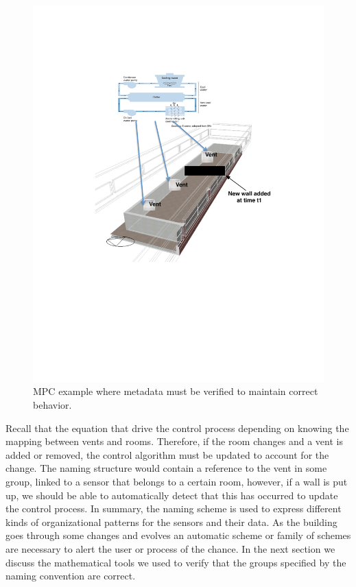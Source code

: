 \begin{figure}[h!] %
\centering
\includegraphics[width=0.5\columnwidth]{figs/mpc_example}
\caption{MPC example where metadata must be verified to maintain correct behavior.}
\label{fig:mpc_example2}
\end{figure}

Recall that the equation that drive the control process depending on knowing the mapping between vents and rooms.  Therefore,
if the room changes and a vent is added or removed, the control algorithm must be updated to account for the change.  The naming
structure would contain a reference to the vent in some group, linked to a sensor that belongs to a certain room, however,
if a wall is put up, we should be able to automatically detect that this has occurred to update the control process.
In summary, the naming scheme is used to express different kinds of organizational patterns for the sensors and their data.
As the building goes through some changes and evolves an automatic scheme or family of schemes are necessary to alert
the user or process of the chance.  In the next
section we discuss the mathematical tools we used to verify that the groups specified by the naming convention are correct.
